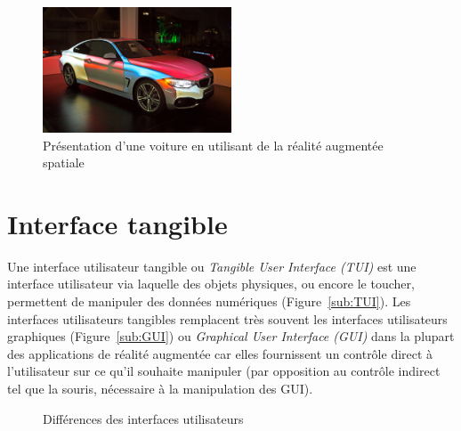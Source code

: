 \begin{figure}[H]
\centering
\includegraphics[width=0.5\textwidth]{images/SARMappingCar2}
\caption{Présentation d'une voiture en utilisant de la réalité augmentée spatiale\protect\footnotemark}
\label{fig:SAR}
\end{figure}

\section{Interface tangible}
\label{sec:tui}
Une interface utilisateur tangible\cite{ishii2008tangible} ou \emph{Tangible User Interface (TUI)} est une interface utilisateur via laquelle des objets physiques, ou encore le toucher, permettent de manipuler des données numériques (Figure~\ref{sub:TUI}). Les interfaces utilisateurs tangibles remplacent très souvent les interfaces utilisateurs graphiques (Figure~\ref{sub:GUI}) ou \emph{Graphical User Interface (GUI)} dans la plupart des applications de réalité augmentée car elles fournissent un contrôle direct à l'utilisateur sur ce qu'il souhaite manipuler (par opposition au contrôle indirect tel que la souris, nécessaire à la manipulation des GUI).

\begin{figure}[H]
    \centering
\caption{Différences des interfaces utilisateurs\protect\footnotemark}
\label{fig:GUITUI}
\end{figure}


